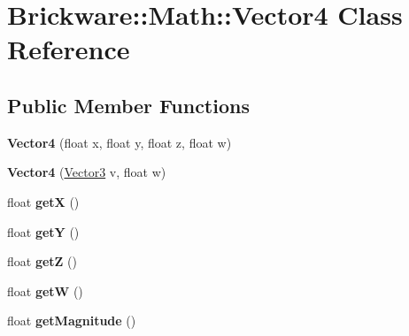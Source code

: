 \hypertarget{classBrickware_1_1Math_1_1Vector4}{}\section{Brickware\+:\+:Math\+:\+:Vector4 Class Reference}
\label{classBrickware_1_1Math_1_1Vector4}
\subsection*{Public Member Functions}
\begin{DoxyCompactItemize}
\item 
\hypertarget{classBrickware_1_1Math_1_1Vector4_ad10f211f59efb91633914c0b109c254a}{}{\bfseries Vector4} (float x, float y, float z, float w)\label{classBrickware_1_1Math_1_1Vector4_ad10f211f59efb91633914c0b109c254a}

\item 
\hypertarget{classBrickware_1_1Math_1_1Vector4_ad3dba0079ece8e6aa9c754dc2f7861bd}{}{\bfseries Vector4} (\hyperlink{classBrickware_1_1Math_1_1Vector3}{Vector3} v, float w)\label{classBrickware_1_1Math_1_1Vector4_ad3dba0079ece8e6aa9c754dc2f7861bd}

\item 
\hypertarget{classBrickware_1_1Math_1_1Vector4_adeb1251faa2bb9df218ea26af0283e35}{}float {\bfseries get\+X} ()\label{classBrickware_1_1Math_1_1Vector4_adeb1251faa2bb9df218ea26af0283e35}

\item 
\hypertarget{classBrickware_1_1Math_1_1Vector4_aa2ab64f477970033a3f055b49b9a941c}{}float {\bfseries get\+Y} ()\label{classBrickware_1_1Math_1_1Vector4_aa2ab64f477970033a3f055b49b9a941c}

\item 
\hypertarget{classBrickware_1_1Math_1_1Vector4_aca485a66d718432d622a6eed8a88c056}{}float {\bfseries get\+Z} ()\label{classBrickware_1_1Math_1_1Vector4_aca485a66d718432d622a6eed8a88c056}

\item 
\hypertarget{classBrickware_1_1Math_1_1Vector4_ae130356da61ae4ef5e509d81b211d305}{}float {\bfseries get\+W} ()\label{classBrickware_1_1Math_1_1Vector4_ae130356da61ae4ef5e509d81b211d305}

\item 
\hypertarget{classBrickware_1_1Math_1_1Vector4_ad4e8931c1c266b2521be57712d91e80d}{}float {\bfseries get\+Magnitude} ()\label{classBrickware_1_1Math_1_1Vector4_ad4e8931c1c266b2521be57712d91e80d}


\end{DoxyCompactItemize}
